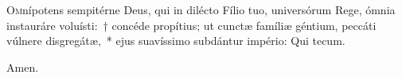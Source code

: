 \lettrine{O}{m}nípotens sempitérne Deus, qui in dilé\-cto Fílio tuo, universórum Rege, ó\-mnia instauráre voluísti:~† concéde propítius; ut cun\-ctæ famíliæ géntium, peccáti vúlnere disgregátæ,~* ejus suavíssimo subdántur império: Qui tecum.

\rr Amen.